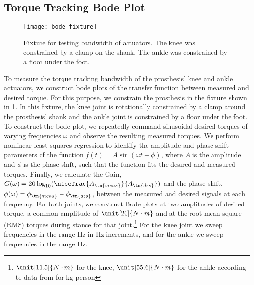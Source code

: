 \subsection{Torque Tracking Bode Plot}
\begin{figure}[htb]
\centerline{\texttt{[image: bode\_fixture]}}
\caption[Fixture for testing bandwidth of actuators]{Fixture for testing
bandwidth of actuators. The knee was constrained by a clamp on the shank. The
ankle was constrained by a floor under the foot.}\label{fig:bode_fixture}
\end{figure}
To measure the torque tracking bandwidth of the prosthesis' knee and ankle
actuators, we construct bode plots of the transfer function between measured and
desired torque. For this purpose, we constrain the prosthesis in the fixture
shown in \cref{fig:bode_fixture}. In this fixture, the knee joint is
rotationally constrained by a clamp around the prosthesis' shank and the ankle
joint is constrained by a floor under the foot. To construct the bode plot, we
repeatedly command sinusoidal desired torques of varying frequencies $\omega$
and observe the resulting measured torques. We perform nonlinear least squares
regression to identify the amplitude and phase shift parameters of the function
$f(t) = A \sin(\omega t + \phi)$, where $A$ is the amplitude and $\phi$ is the
phase shift, such that the function fits the desired and measured torques.
Finally, we calculate the Gain, $G(\omega) = 20 \log_{10}
(\nicefrac{A_\tn{meas}}{A_\tn{des}})$ and the phase shift, $\phi(\omega) =
\phi_\tn{meas} - \phi_\tn{des}$, between the measured and desired signals at
each frequency. For both joints, we construct Bode plots at two amplitudes of
desired torque, a common amplitude of $\unit[20]{N \cdot m}$ and at the root
mean square (RMS) torques during stance for that joint.\footnote{$\unit[11.5]{N
\cdot m}$ for the knee, $\unit[55.6]{N \cdot m}$ for the ankle according to data
from \citet{bovi2011multiple} for \unit[80]{kg} person} For the knee joint we
sweep frequencies in the range \unit[1-35]{Hz} in \unit[1]{Hz} increments, and
for the ankle we sweep frequencies in the range \unit[1-20]{Hz}.

